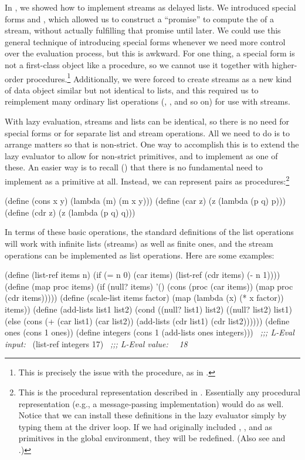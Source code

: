 In , we showed how to implement streams as delayed lists.
We introduced special forms  and , which allowed
us to construct a ``promise'' to compute the  of a stream, without
actually fulfilling that promise until later.  We could use this general
technique of introducing special forms whenever we need more control over the
evaluation process, but this is awkward.  For one thing, a special form is not
a first-class object like a procedure, so we cannot use it together with
higher-order procedures.\footnote{This is precisely the issue with the
 procedure, as in .}  Additionally, we were
forced to create streams as a new kind of data object similar but not identical
to lists, and this required us to reimplement many ordinary list operations
(, , and so on) for use with streams.

With lazy evaluation, streams and lists can be identical, so there is no need
for special forms or for separate list and stream operations.  All we need to
do is to arrange matters so that  is non-strict.  One way to
accomplish this is to extend the lazy evaluator to allow for non-strict
primitives, and to implement  as one of these.  An easier way is to
recall () that there is no fundamental need to implement
 as a primitive at all.  Instead, we can represent pairs as
procedures:\footnote{This is the procedural representation described in
.  Essentially any procedural representation (e.g., a
message-passing implementation) would do as well.  Notice that we can install
these definitions in the lazy evaluator simply by typing them at the driver
loop.  If we had originally included , , and  as
primitives in the global environment, they will be redefined.  (Also see
 and .)}

\begin{codeBlock}
(define (cons x y) (lambda (m) (m x y)))
(define (car z) (z (lambda (p q) p)))
(define (cdr z) (z (lambda (p q) q)))
\end{codeBlock}

\noindent
In terms of these basic operations, the standard definitions of the list
operations will work with infinite lists (streams) as well as finite ones, and
the stream operations can be implemented as list operations.  Here are some
examples:

\begin{codeBlock}
(define (list-ref items n)
  (if (= n 0)
      (car items)
      (list-ref (cdr items) (- n 1))))
(define (map proc items)
  (if (null? items)
      '()
      (cons (proc (car items)) (map proc (cdr items)))))
(define (scale-list items factor)
  (map (lambda (x) (* x factor)) items))
(define (add-lists list1 list2)
  (cond ((null? list1) list2)
        ((null? list2) list1)
        (else (cons (+ (car list1) (car list2))
                    (add-lists (cdr list1) (cdr list2))))))
(define ones (cons 1 ones))
(define integers (cons 1 (add-lists ones integers)))
~\textit{;;; L-Eval input:}~
(list-ref integers 17)
~\textit{;;; L-Eval value:}~
~\textit{18}~
\end{codeBlock}

